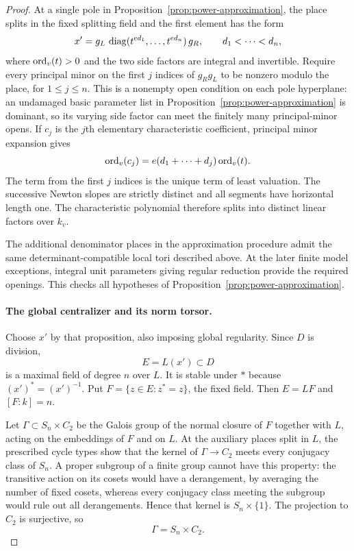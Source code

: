 \begin{proof}
At a single pole in Proposition~\ref{prop:power-approximation}, the place
splits in the fixed splitting field and the first element has the form
\[
 x'=g_L\,\operatorname{diag}(t^{e d_1},\ldots,t^{e d_n})\,g_R,
 \qquad d_1<\cdots<d_n,
\]
where $\operatorname{ord}_v(t)>0$ and the two side factors are integral and invertible.
Require every principal minor on the first $j$ indices of $g_Rg_L$ to
be nonzero modulo the place, for $1\leq j\leq n$.  This is a nonempty
open condition on each pole hyperplane: an undamaged basic parameter
list in Proposition~\ref{prop:power-approximation} is dominant, so its
varying side factor can meet the finitely many principal-minor opens.
If $c_j$ is the $j$th elementary characteristic coefficient, principal
minor expansion gives
\begin{equation}\label{eq:colors-pole-valuations}
 \operatorname{ord}_v(c_j)=e(d_1+\cdots+d_j)\operatorname{ord}_v(t).
\end{equation}
The term from the first $j$ indices is the unique term of least
valuation.  The successive Newton slopes are strictly distinct and all
segments have horizontal length one.  The characteristic polynomial
therefore splits into distinct linear factors over $k_v$.

The additional denominator places in the approximation procedure admit
the same determinant-compatible local tori described above.  At the
later finite model exceptions, integral unit parameters giving regular
reduction provide the required openings.  This checks all hypotheses
of Proposition~\ref{prop:power-approximation}.

\paragraph{The global centralizer and its norm torsor.}
Choose $x'$ by that proposition, also imposing global regularity.  Since
$D$ is division,
\[
 E=L(x')\subset D
\]
is a maximal field of degree $n$ over $L$.  It is stable under $*$ because
$(x')^*=(x')^{-1}$.  Put $F=\{z\in E:z^*=z\}$, the fixed field.
Then $E=LF$ and
$[F:k]=n$.

Let $\Gamma\subset S_n\times C_2$ be the Galois group of the normal
closure of $F$ together with $L$, acting on the embeddings of $F$ and on
$L$.  At the auxiliary places split in $L$, the prescribed cycle types
show that the kernel of $\Gamma\to C_2$ meets every conjugacy class of
$S_n$.  A proper subgroup of a finite group cannot have this property:
the transitive action on its cosets would have a derangement, by
averaging the number of fixed cosets, whereas every conjugacy class
meeting the subgroup would rule out all derangements.  Hence that
kernel is $S_n\times\{1\}$.  The projection to $C_2$ is surjective, so
\[
 \Gamma=S_n\times C_2.
\]


\end{proof}
